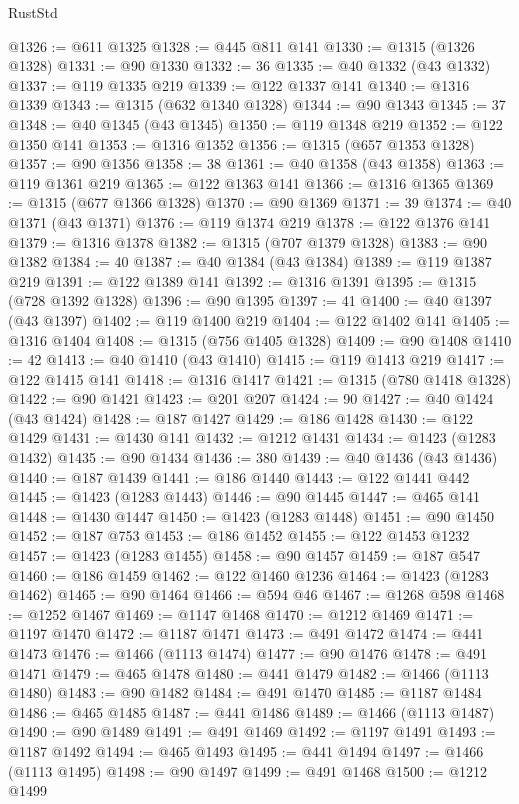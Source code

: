 \begin{lexlean}{RustStd}
\begin{coremodule}
@1326 := @611 @1325
@1328 := @445 @811 @141
@1330 := @1315 (@1326 @1328)
@1331 := @90 @1330
@1332 := 36
@1335 := @40 @1332 (@43 @1332)
@1337 := @119 @1335 @219
@1339 := @122 @1337 @141
@1340 := @1316 @1339
@1343 := @1315 (@632 @1340 @1328)
@1344 := @90 @1343
@1345 := 37
@1348 := @40 @1345 (@43 @1345)
@1350 := @119 @1348 @219
@1352 := @122 @1350 @141
@1353 := @1316 @1352
@1356 := @1315 (@657 @1353 @1328)
@1357 := @90 @1356
@1358 := 38
@1361 := @40 @1358 (@43 @1358)
@1363 := @119 @1361 @219
@1365 := @122 @1363 @141
@1366 := @1316 @1365
@1369 := @1315 (@677 @1366 @1328)
@1370 := @90 @1369
@1371 := 39
@1374 := @40 @1371 (@43 @1371)
@1376 := @119 @1374 @219
@1378 := @122 @1376 @141
@1379 := @1316 @1378
@1382 := @1315 (@707 @1379 @1328)
@1383 := @90 @1382
@1384 := 40
@1387 := @40 @1384 (@43 @1384)
@1389 := @119 @1387 @219
@1391 := @122 @1389 @141
@1392 := @1316 @1391
@1395 := @1315 (@728 @1392 @1328)
@1396 := @90 @1395
@1397 := 41
@1400 := @40 @1397 (@43 @1397)
@1402 := @119 @1400 @219
@1404 := @122 @1402 @141
@1405 := @1316 @1404
@1408 := @1315 (@756 @1405 @1328)
@1409 := @90 @1408
@1410 := 42
@1413 := @40 @1410 (@43 @1410)
@1415 := @119 @1413 @219
@1417 := @122 @1415 @141
@1418 := @1316 @1417
@1421 := @1315 (@780 @1418 @1328)
@1422 := @90 @1421
@1423 := @201 @207
@1424 := 90
@1427 := @40 @1424 (@43 @1424)
@1428 := @187 @1427
@1429 := @186 @1428
@1430 := @122 @1429
@1431 := @1430 @141
@1432 := @1212 @1431
@1434 := @1423 (@1283 @1432)
@1435 := @90 @1434
@1436 := 380
@1439 := @40 @1436 (@43 @1436)
@1440 := @187 @1439
@1441 := @186 @1440
@1443 := @122 @1441 @442
@1445 := @1423 (@1283 @1443)
@1446 := @90 @1445
@1447 := @465 @141
@1448 := @1430 @1447
@1450 := @1423 (@1283 @1448)
@1451 := @90 @1450
@1452 := @187 @753
@1453 := @186 @1452
@1455 := @122 @1453 @1232
@1457 := @1423 (@1283 @1455)
@1458 := @90 @1457
@1459 := @187 @547
@1460 := @186 @1459
@1462 := @122 @1460 @1236
@1464 := @1423 (@1283 @1462)
@1465 := @90 @1464
@1466 := @594 @46
@1467 := @1268 @598
@1468 := @1252 @1467
@1469 := @1147 @1468
@1470 := @1212 @1469
@1471 := @1197 @1470
@1472 := @1187 @1471
@1473 := @491 @1472
@1474 := @441 @1473
@1476 := @1466 (@1113 @1474)
@1477 := @90 @1476
@1478 := @491 @1471
@1479 := @465 @1478
@1480 := @441 @1479
@1482 := @1466 (@1113 @1480)
@1483 := @90 @1482
@1484 := @491 @1470
@1485 := @1187 @1484
@1486 := @465 @1485
@1487 := @441 @1486
@1489 := @1466 (@1113 @1487)
@1490 := @90 @1489
@1491 := @491 @1469
@1492 := @1197 @1491
@1493 := @1187 @1492
@1494 := @465 @1493
@1495 := @441 @1494
@1497 := @1466 (@1113 @1495)
@1498 := @90 @1497
@1499 := @491 @1468
@1500 := @1212 @1499

\end{coremodule}
\end{lexlean}
